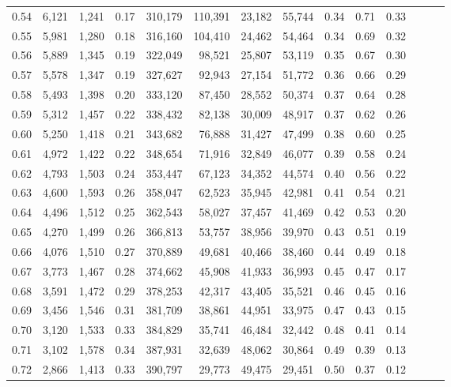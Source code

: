 \begin{tabular}{rrrrrrrrrrrrrr}
0.54 &  6,121 &  1,241 &  0.17 &  310,179 &  110,391 &  23,182 &  55,744 &  0.34 &  0.71 &      0.33 \\
0.55 &  5,981 &  1,280 &  0.18 &  316,160 &  104,410 &  24,462 &  54,464 &  0.34 &  0.69 &      0.32 \\
0.56 &  5,889 &  1,345 &  0.19 &  322,049 &   98,521 &  25,807 &  53,119 &  0.35 &  0.67 &      0.30 \\
0.57 &  5,578 &  1,347 &  0.19 &  327,627 &   92,943 &  27,154 &  51,772 &  0.36 &  0.66 &      0.29 \\
0.58 &  5,493 &  1,398 &  0.20 &  333,120 &   87,450 &  28,552 &  50,374 &  0.37 &  0.64 &      0.28 \\
0.59 &  5,312 &  1,457 &  0.22 &  338,432 &   82,138 &  30,009 &  48,917 &  0.37 &  0.62 &      0.26 \\
0.60 &  5,250 &  1,418 &  0.21 &  343,682 &   76,888 &  31,427 &  47,499 &  0.38 &  0.60 &      0.25 \\
0.61 &  4,972 &  1,422 &  0.22 &  348,654 &   71,916 &  32,849 &  46,077 &  0.39 &  0.58 &      0.24 \\
0.62 &  4,793 &  1,503 &  0.24 &  353,447 &   67,123 &  34,352 &  44,574 &  0.40 &  0.56 &      0.22 \\
0.63 &  4,600 &  1,593 &  0.26 &  358,047 &   62,523 &  35,945 &  42,981 &  0.41 &  0.54 &      0.21 \\
0.64 &  4,496 &  1,512 &  0.25 &  362,543 &   58,027 &  37,457 &  41,469 &  0.42 &  0.53 &      0.20 \\
0.65 &  4,270 &  1,499 &  0.26 &  366,813 &   53,757 &  38,956 &  39,970 &  0.43 &  0.51 &      0.19 \\
0.66 &  4,076 &  1,510 &  0.27 &  370,889 &   49,681 &  40,466 &  38,460 &  0.44 &  0.49 &      0.18 \\
0.67 &  3,773 &  1,467 &  0.28 &  374,662 &   45,908 &  41,933 &  36,993 &  0.45 &  0.47 &      0.17 \\
0.68 &  3,591 &  1,472 &  0.29 &  378,253 &   42,317 &  43,405 &  35,521 &  0.46 &  0.45 &      0.16 \\
0.69 &  3,456 &  1,546 &  0.31 &  381,709 &   38,861 &  44,951 &  33,975 &  0.47 &  0.43 &      0.15 \\
0.70 &  3,120 &  1,533 &  0.33 &  384,829 &   35,741 &  46,484 &  32,442 &  0.48 &  0.41 &      0.14 \\
0.71 &  3,102 &  1,578 &  0.34 &  387,931 &   32,639 &  48,062 &  30,864 &  0.49 &  0.39 &      0.13 \\
0.72 &  2,866 &  1,413 &  0.33 &  390,797 &   29,773 &  49,475 &  29,451 &  0.50 &  0.37 &      0.12 \\

\end{tabular}
